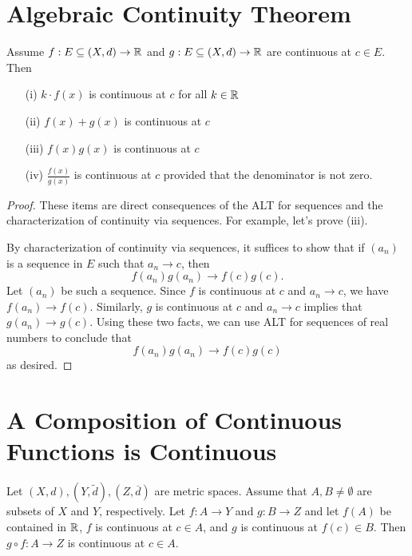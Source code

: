 \documentclass[a4paper]{article}
\begin{document}
\section{Algebraic Continuity Theorem}\label{Algebraic Continuity Theorem}

\begin{theorem}
    Assume \( f: E \subseteq (X,d) \to \mathbb{R}   \) and \( g: E \subseteq (X,d) \to \mathbb{R}   \) are continuous at \( c \in E  \). Then
    \begin{enumerate}
        \item[(i)] \( k \cdot f (x) \) is continuous at \( c  \) for all \( k \in  \mathbb{R}  \)
        \item[(ii)] \( f(x) + g(x)  \) is continuous at \( c  \)
        \item[(iii)] \( f(x) g(x)  \) is continuous at \( c  \)
        \item[(iv)] \( \frac{ f(x) }{  g(x) }  \) is continuous at \( c  \) provided that the denominator is not zero.
    \end{enumerate}
\end{theorem}
\begin{proof}
These items are direct consequences of the ALT for sequences and the characterization of continuity via sequences. For example, let's prove (iii).

By characterization of continuity via sequences, it suffices to show that if \( ({a}_{n}) \) is a sequence in \( E  \) such that \( {a}_{n} \to c  \), then
\[  f({a}_{n}) g({a}_{n}) \to f(c) g(c). \]
Let \( ({a}_{n}) \) be such a sequence. Since \( f \) is continuous at \( c  \) and \( {a}_{n} \to c  \), we have \( f({a}_{n}) \to f(c) \). Similarly, \( g  \) is continuous at \( c  \) and \( {a}_{n} \to c  \) implies that \( g({a}_{n}) \to g(c) \). Using these two facts, we can use ALT for sequences of real numbers to conclude that 
\[  f({a}_{n}) g({a}_{n}) \to f(c) g(c) \]
as desired.
\end{proof}

\section{A Composition of Continuous Functions is Continuous}\label{A Composition of Continuous Functions is Continuous}

\begin{theorem}
    Let \( (X,d), (Y, \tilde{d}), (Z,\overline{d}) \) are metric spaces. Assume that \( A,B \neq \emptyset \) are subsets of \( X  \) and \( Y  \), respectively. Let \( f: A \to Y  \) and \( g: B \to Z  \) and let \( f(A) \) be contained in \( \mathbb{R}  \), \( f  \) is continuous at \( c \in A  \), and \( g \) is continuous at \( f(c) \in B \). Then \( g \circ f : A \to Z  \) is continuous at \( c \in A  \).
\end{theorem}
\end{document}
